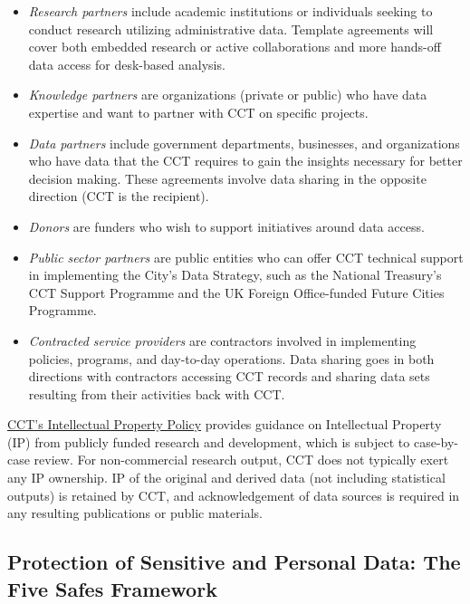 \documentclass[
]{WileySix}
\providecommand{\tightlist}{%
  \setlength{\itemsep}{0pt}\setlength{\parskip}{0pt}}
\begin{document}
\begin{itemize}
\tightlist
\item
  \emph{Research partners} include academic institutions or individuals seeking to conduct research utilizing administrative data. Template agreements will cover both embedded research or active collaborations and more hands-off data access for desk-based analysis.
\item
  \emph{Knowledge partners} are organizations (private or public) who have data expertise and want to partner with CCT on specific projects.
\item
  \emph{Data partners} include government departments, businesses, and organizations who have data that the CCT requires to gain the insights necessary for better decision making. These agreements involve data sharing in the opposite direction (CCT is the recipient).
\item
  \emph{Donors} are funders who wish to support initiatives around data access.
\item
  \emph{Public sector partners} are public entities who can offer CCT technical support in implementing the City's Data Strategy, such as the National Treasury's CCT Support Programme and the UK Foreign Office-funded Future Cities Programme.
\item
  \emph{Contracted service providers} are contractors involved in implementing policies, programs, and day-to-day operations. Data sharing goes in both directions with contractors accessing CCT records and sharing data sets resulting from their activities back with CCT.
\end{itemize}

\href{https://resource.capetown.gov.za/documentcentre/Documents/Bylaws\%20and\%20policies/Intellectual_Property_Policy.pdf}{CCT's Intellectual Property Policy} provides guidance on Intellectual Property (IP) from publicly funded research and development, which is subject to case-by-case review. For non-commercial research output, CCT does not typically exert any IP ownership. IP of the original and derived data (not including statistical outputs) is retained by CCT, and acknowledgement of data sources is required in any resulting publications or public materials.

\hypertarget{protection-of-sensitive-and-personal-data-the-five-safes-framework-6}{%
\subsection{Protection of Sensitive and Personal Data: The Five Safes Framework}\label{protection-of-sensitive-and-personal-data-the-five-safes-framework-6}}
\end{document}
